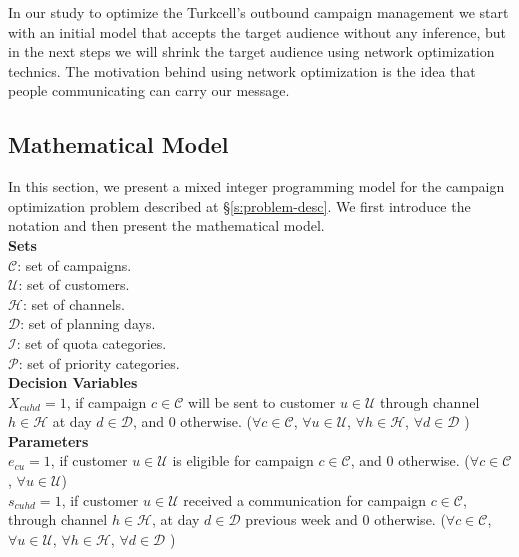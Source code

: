 \documentclass[11pt]{article}
\begin{document}
In our study to optimize the Turkcell’s outbound campaign management we start with an initial model that accepts the target audience without any inference, but in the next steps we will shrink the target audience using network optimization technics. The motivation behind using network optimization is the idea that people communicating can carry our message. 

\subsection{Mathematical Model} \label{s:problem-math}

In this section, we present a mixed integer programming model for the campaign optimization problem described at \S \ref{s:problem-desc}. We first introduce the notation and then present the mathematical model.\\

\noindent \textbf{Sets}\\

\noindent ${\mathcal{C}}$: set of campaigns. \\
\noindent ${\mathcal{U}}$: set of customers. \\
\noindent ${\mathcal{H}}$: set of channels. \\
\noindent ${\mathcal{D}}$: set of planning days. \\
\noindent ${\mathcal{I}}$: set of quota categories. \\
\noindent ${\mathcal{P}}$: set of priority categories. \\

\noindent \textbf{Decision Variables}\\

\noindent $X_{{c}{u}{h}{d}}=1$, if campaign $c \in \mathcal{C}$ will be sent to customer $u \in \mathcal{U}$ through channel $h \in \mathcal{H}$ at day $d \in \mathcal{D}$, and 0 otherwise.
($\forall c \in \mathcal{C}$, $\forall u \in \mathcal{U}$, $\forall h \in \mathcal{H}$, $\forall d \in \mathcal{D}$ )\\

\noindent \textbf{Parameters}\\

\noindent $e_{{c}{u}}=1$, if customer $u \in \mathcal{U}$ is eligible for campaign $c \in \mathcal{C}$, and 0 otherwise.
($\forall c \in \mathcal{C}$, $\forall u \in \mathcal{U}$)\\

\noindent $s_{{c}{u}{h}{d}}=1$, if customer $u \in \mathcal{U}$ received a communication for campaign $c \in \mathcal{C}$, through channel $h \in \mathcal{H}$, at day $d \in \mathcal{D}$ previous week and 0 otherwise.
($\forall c \in \mathcal{C}$, $\forall u \in \mathcal{U}$, $\forall h \in \mathcal{H}$, $\forall d \in \mathcal{D}$ )\\
\end{document}
